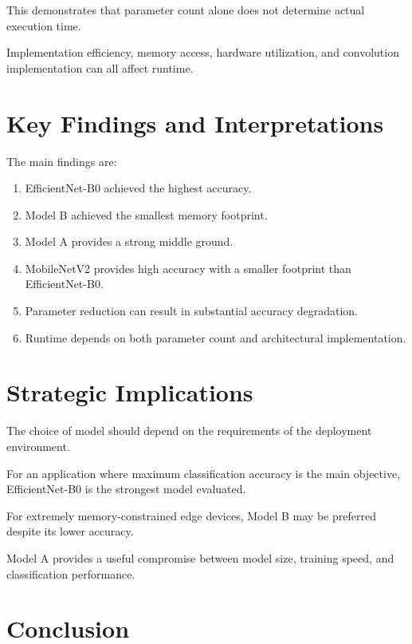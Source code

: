 \documentclass[12pt,a4paper]{report}
\begin{document}
This demonstrates that parameter count alone does not determine
actual execution time.

Implementation efficiency, memory access, hardware utilization,
and convolution implementation can all affect runtime.

\section{Key Findings and Interpretations}

The main findings are:

\begin{enumerate}
    \item EfficientNet-B0 achieved the highest accuracy.
    \item Model B achieved the smallest memory footprint.
    \item Model A provides a strong middle ground.
    \item MobileNetV2 provides high accuracy with a smaller
    footprint than EfficientNet-B0.
    \item Parameter reduction can result in substantial accuracy
    degradation.
    \item Runtime depends on both parameter count and architectural
    implementation.
\end{enumerate}

\section{Strategic Implications}

The choice of model should depend on the requirements of the
deployment environment.

For an application where maximum classification accuracy is the
main objective, EfficientNet-B0 is the strongest model evaluated.

For extremely memory-constrained edge devices, Model B may be
preferred despite its lower accuracy.

Model A provides a useful compromise between model size,
training speed, and classification performance.

\section{Conclusion}
\end{document}
